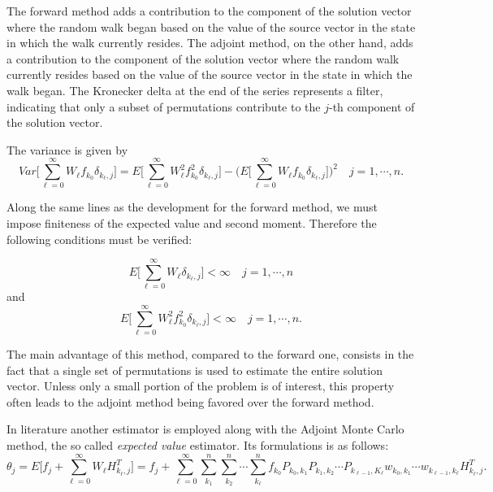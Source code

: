 The forward method adds a contribution to the component of the solution
vector where the random walk began based on the value of the source vector
in the state in which the walk currently resides.  The adjoint method,
on the other hand, adds a contribution to the component of the solution
vector where the random walk currently resides based on the value of the
source vector in the state in which the walk began.
The Kronecker delta at the end of the series represents a filter, indicating
that only a subset of permutations contribute to the $j$-th component
of the solution vector.

The variance is given by
\begin{equation}
Var\bigg [\sum_{\ell=0}^\infty W_{\ell}
f_{k_0}\delta_{k_{\ell},j}\bigg]=E\bigg[\sum_{\ell=0}^\infty W_{\ell}^2
f_{k_0}^2\delta_{k_{\ell},j}\bigg ] - \bigg (E\bigg[\sum_{\ell=0}^\infty
W_{\ell}
f_{k_0}\delta_{k_{\ell},j}\bigg]\bigg )^2\quad j=1,\cdots,n
\label{adj_var}.
\end{equation}

Along the same lines as the development for the forward method, we must
impose finiteness of the expected value and second moment.
Therefore the following
conditions must be verified:

\begin{equation}
 E\bigg[\sum_{\ell=0}^\infty W_{\ell}\delta_{k_{\ell},
j}\bigg]<\infty \quad j=1,\cdots,n
\end{equation}
and
\begin{equation}
 E\bigg[\sum_{\ell=0}^\infty W_{\ell}^2
f_{k_0}^2\delta_{k_{\ell},j}\bigg]<\infty \quad j=1,\cdots,n.
\end{equation}

The main advantage of this method, compared to the forward one, consists in the
fact that a single set of permutations is used to estimate the entire solution
vector.  Unless only a small portion of the problem is of interest, this
property often leads to the adjoint method being favored over the forward method.

In literature another estimator is employed along with the Adjoint Monte Carlo
method, the so called \textit{expected value} estimator. Its
formulations is as follows:
\begin{equation}
\theta_j=E\bigg[f_j + \sum_{\ell=0}^\infty
W_{\ell}H_{k_{\ell}, j}^T\bigg]=f_j
+ \sum_{\ell=0}^{\infty}\sum_{k_1}^n\sum_{k_2} ^n\cdots\sum_ { k_ { \ell}}^n
f_{k_0}P_{k_0,k_1}P_{k_1,k_2}\cdots P_{k_{\ell-1},K_{\ell}}w_{k_0,k_1}\cdots
w_{k_{\ell-1},k_{\ell}}H_{k_{\ell},j}^T.
\label{adj_mean1}
\end{equation}

